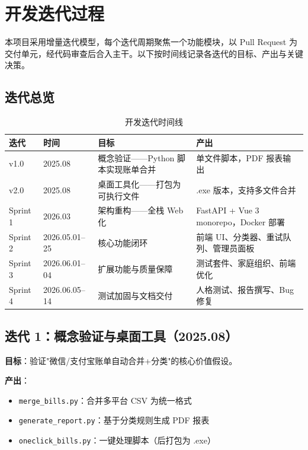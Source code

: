 \section{开发迭代过程}

本项目采用增量迭代模型，每个迭代周期聚焦一个功能模块，以 Pull Request 为交付单元，经代码审查后合入主干。以下按时间线记录各迭代的目标、产出与关键决策。

\subsection{迭代总览}

\begin{table}[H]
  \centering
  \small
  \caption{开发迭代时间线}
  \label{tab:iteration-timeline}
  \begin{tabular}{@{}p{1.2cm} p{2.8cm} p{4.5cm} p{4.5cm}@{}}
    \toprule
    \textbf{迭代} & \textbf{时间} & \textbf{目标} & \textbf{产出} \\
    \midrule
    v1.0 & 2025.08 & 概念验证——Python 脚本实现账单合并 & 单文件脚本，PDF 报表输出 \\
    \hline
    v2.0 & 2025.08 & 桌面工具化——打包为可执行文件 & .exe 版本，支持多文件合并 \\
    \hline
    Sprint 1 & 2026.03 & 架构重构——全栈 Web 化 & FastAPI + Vue 3 monorepo，Docker 部署 \\
    \hline
    Sprint 2 & 2026.05.01--25 & 核心功能闭环 & 前端 UI、分类器、重试队列、管理员面板 \\
    \hline
    Sprint 3 & 2026.06.01--04 & 扩展功能与质量保障 & 测试套件、家庭组织、前端优化 \\
    \hline
    Sprint 4 & 2026.06.05--14 & 测试加固与文档交付 & 人格测试、报告撰写、Bug 修复 \\
    \bottomrule
  \end{tabular}
\end{table}

\subsection{迭代 1：概念验证与桌面工具（2025.08）}

\textbf{目标}：验证"微信/支付宝账单自动合并+分类"的核心价值假设。

\textbf{产出}：
\begin{itemize}
  \item \texttt{merge\_bills.py}：合并多平台 CSV 为统一格式
  \item \texttt{generate\_report.py}：基于分类规则生成 PDF 报表
  \item \texttt{oneclick\_bills.py}：一键处理脚本（后打包为 .exe）
\end{itemize}

